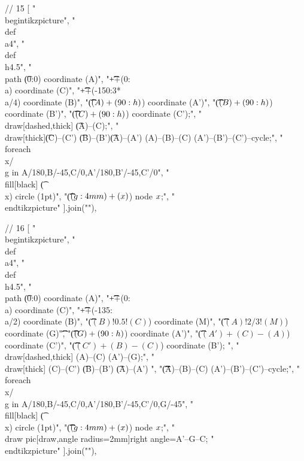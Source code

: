 // 15
[
"\\begin{tikzpicture}",
"\t\\def\\a{4}",
"\t\\def\\h{4.5}",
"\t\\path \t(0:0) coordinate (A)",
"\t\t\t++(0:\\a) coordinate (C)",
"\t\t\t++(-150:3*\\a/4) coordinate (B)",
"\t\t\t($(A)+(90:\\h)$) coordinate (A')",
"\t\t\t($(B)+(90:\\h)$) coordinate (B')",
"\t\t\t($(C)+(90:\\h)$) coordinate (C');",
"\t\\draw[dashed,thick] \t(A)--(C);",
"\t\\draw[thick]\t(C)--(C') \t(B)--(B')\t(A)--(A') (A)--(B)--(C) (A')--(B')--(C')--cycle;",
"\t\\foreach \\x/\\g in {A/180,B/-45,C/0,A'/180,B'/-45,C'/0}",
"\t\t\t\\fill[black] \t(\\x) circle (1pt)",
"\t\t\t($(\\g:4mm)+(\\x)$) node {$\\x$};",
"\\end{tikzpicture}"
].join("\n"),

// 16
[
"\\begin{tikzpicture}",
"\t\\def\\a{4}",
"\t\\def\\h{4.5}",
"\t\\path \t(0:0) coordinate (A)",
"\t\t\t++(0:\\a) coordinate (C)",
"\t\t\t++(-135:\\a/2) coordinate (B)",
"\t\t\t($(B)!0.5!(C)$) coordinate (M)",
"\t\t\t($(A)!2/3!(M)$) coordinate (G)\t\t\t",
"\t\t\t($(G)+(90:\\h)$) coordinate (A')",
"\t\t\t($(A')+(C)-(A)$) coordinate (C')",
"\t\t\t($(C')+(B)-(C)$) coordinate (B'); ",
"\t\\draw[dashed,thick] (A)--(C) (A')--(G);",
"\t\\draw[thick] (C)--(C') \t(B)--(B') \t(A)--(A') ",
"\t\t\t\t(A)--(B)--(C) (A')--(B')--(C')--cycle;",
"\t\\foreach \\x/\\g in {A/180,B/-45,C/0,A'/180,B'/-45,C'/0,G/-45}",
"\t\t\t\t\\fill[black] \t(\\x) circle (1pt)",
"\t\t\t\t($(\\g:4mm)+(\\x)$) node {$\\x$};",
"\t\\draw pic[draw,angle radius=2mm]{right angle=A'--G--C};%
"\\end{tikzpicture}"
].join("\n"),


